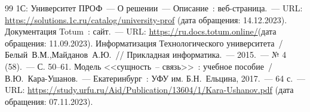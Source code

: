 {}
\begin{thebibliography}{99}
	 1С: Университет ПРОФ~--- О решении~--- Описание~: веб-страница.~--- URL: \href{https://solutions.1c.ru/catalog/university-prof}{https://solutions.1c.ru/catalog/university-prof} (дата обращения: 14.12.2023).
	 Документация Totum~: сайт.~--- URL: \href{https://ru.docs.totum.online/}{https://ru.docs.totum.online/}\linebreak (дата обращения: 11.09.2023).
	 Информатизация Технологического университета~/ Белый~В.М.,\linebreak Майданов~А.Ю.~// Прикладная информатика.~--- 2015.~--- № 4 (58).~--- С. 50--61.
	 Модель <<сущность~-- связь>>~: учебное пособие~/ В.Ю.~Кара-Ушанов.~--- Екатеринбург~: УФУ им. Б.Н.~Ельцина, 2017.~--- 64 с.~--- URL: \href{https://study.urfu.ru/Aid/Publication/13604/1/Kara-Ushanov.pdf}{https://study.urfu.ru/Aid/Publication/13604/1/Kara-Ushanov.pdf} (дата обращения: 07.11.2023).
\end{thebibliography}